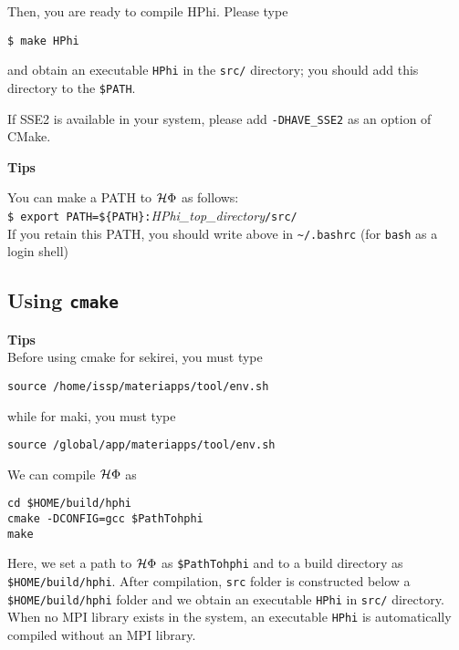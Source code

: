 Then, you are ready to compile HPhi.
Please type
\begin{verbatim}
$ make HPhi
\end{verbatim}
and obtain an executable \verb|HPhi| in the \verb|src/| directory;
you should add this directory to the \verb|$PATH|.

If SSE2 is available in your system, please add \verb|-DHAVE_SSE2| as an option of CMake.

\begin{screen}
\Large 
{\bf Tips}
\normalsize

You can make a PATH to $\mathcal{H} \Phi$ as follows:
\\
\verb|$ export PATH=${PATH}:|\textit{HPhi\_top\_directory}\verb|/src/|
\\
If you retain this PATH, you should write above in \verb|~/.bashrc|
(for \verb|bash| as a login shell)

\end{screen}


\subsection{Using \texttt{cmake}}

\begin{screen}
\Large 
{\bf Tips}
\normalsize\\
Before using cmake for sekirei, you must type 
\begin{verbatim}
source /home/issp/materiapps/tool/env.sh
\end{verbatim}
while for maki, you must type
\begin{verbatim}
source /global/app/materiapps/tool/env.sh
\end{verbatim}
\end{screen}

We can compile $\mathcal{H} \Phi$ as
\begin{verbatim}
cd $HOME/build/hphi
cmake -DCONFIG=gcc $PathTohphi
make
\end{verbatim}
Here, we set a path to $\mathcal{H} \Phi$ as \verb|$PathTohphi|
and to a build directory as \verb| $HOME/build/hphi|.
After compilation, \verb|src| folder is constructed below a \verb|$HOME/build/hphi|
folder and we obtain an executable \verb|HPhi| in \verb|src/| directory.
When no MPI library exists in the system, an executable \verb|HPhi|
is automatically compiled without an MPI library.

